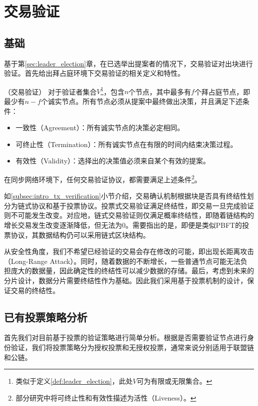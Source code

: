 \section{交易验证}
\subsection{基础}
基于第\ref{sec:leader_election}章，在已选举出提案者的情况下，交易验证对出块进行验证。首先给出拜占庭环境下交易验证的相关定义和特性。

\begin{definition}
（交易验证） 对于验证者集合$V$\footnote{类似于定义\ref{def:leader_election}，此处$V$可为有限或无限集合。}，包含$n$个节点，其中最多有$f$个拜占庭节点，即最少有$n-f$个诚实节点。所有节点必须从提案中最终做出决策，并且满足下述条件：
\begin{itemize}
	\item 一致性（Agreement）：所有诚实节点的决策必定相同。
	\item 可终止性（Termination）：所有诚实节点在有限的时间内结束决策过程。
	\item 有效性（Validity）：选择出的决策值必须来自某个有效的提案。
\end{itemize}
\end{definition}

在同步网络环境下，任何交易验证协议，都需要满足上述条件\footnote{部分研究中将可终止性和有效性描述为活性（Liveness）。}。%

如\ref{subsec:intro_tx_verification}小节介绍，交易确认机制根据块是否具有终结性划分为链式协议和基于投票协议。投票式交易验证满足终结性，即交易一旦完成验证则不可能发生改变。对应地，链式交易验证则仅满足概率终结性，即随着链结构的增长交易发生改变逐渐降低，但无法为$0$。需要指出的是，即便是类似PBFT的投票协议，其数据结构仍可以采用链式区块结构。

从安全性角度，我们不希望已经验证的交易会存在修改的可能，即出现长距离攻击（Long-Range Attack）。同时，随着数据的不断增长，一些普通节点可能无法负担庞大的数据量，因此确定性的终结性可以减少数据的存储。最后，考虑到未来的分片设计，数据分片需要终结性作为基础。因此我们采用基于投票机制的设计，保证交易的终结性。


\subsection{已有投票策略分析}
首先我们对目前基于投票的验证策略进行简单分析。根据是否需要验证节点进行身份验证，我们将投票策略分为授权投票和无授权投票，通常来说分别适用于联盟链和公链。

